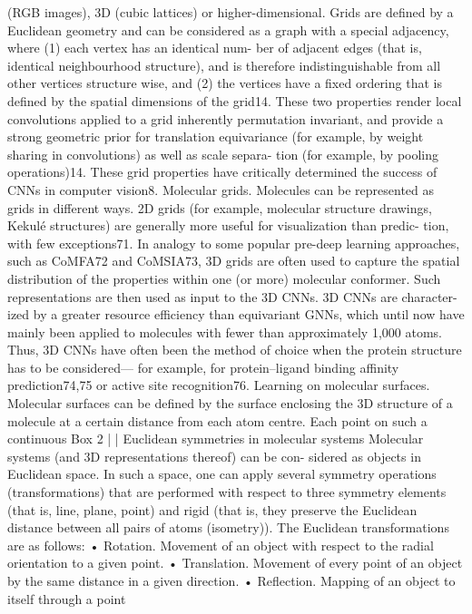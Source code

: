 (RGB images), 3D (cubic lattices) or higher-dimensional. Grids are
defined by a Euclidean geometry and can be considered as a graph
with a special adjacency, where (1) each vertex has an identical num-
ber of adjacent edges (that is, identical neighbourhood structure),
and is therefore indistinguishable from all other vertices structure
wise, and (2) the vertices have a fixed ordering that is defined by the
spatial dimensions of the grid14. These two properties render local
convolutions applied to a grid inherently permutation invariant, and
provide a strong geometric prior for translation equivariance (for
example, by weight sharing in convolutions) as well as scale separa-
tion (for example, by pooling operations)14. These grid properties
have critically determined the success of CNNs in computer vision8.
Molecular grids. Molecules can be represented as grids in different
ways. 2D grids (for example, molecular structure drawings, Kekulé
structures) are generally more useful for visualization than predic-
tion, with few exceptions71. In analogy to some popular pre-deep
learning approaches, such as CoMFA72 and CoMSIA73, 3D grids
are often used to capture the spatial distribution of the properties
within one (or more) molecular conformer. Such representations
are then used as input to the 3D CNNs. 3D CNNs are character-
ized by a greater resource efficiency than equivariant GNNs, which
until now have mainly been applied to molecules with fewer than
approximately 1,000 atoms. Thus, 3D CNNs have often been the
method of choice when the protein structure has to be considered—
for example, for protein–ligand binding affinity prediction74,75 or
active site recognition76.
Learning on molecular surfaces. Molecular surfaces can be defined
by the surface enclosing the 3D structure of a molecule at a certain
distance from each atom centre. Each point on such a continuous
Box 2 | | Euclidean symmetries in molecular systems
Molecular systems (and 3D representations thereof) can be con-
sidered as objects in Euclidean space. In such a space, one can
apply several symmetry operations (transformations) that are
performed with respect to three symmetry elements (that is,
line, plane, point) and rigid (that is, they preserve the Euclidean
distance between all pairs of atoms (isometry)). The Euclidean
transformations are as follows:
•
Rotation. Movement of an object with respect to the radial
orientation to a given point.
•
Translation. Movement of every point of an object by the
same distance in a given direction.
•
Reflection. Mapping of an object to itself through a point
